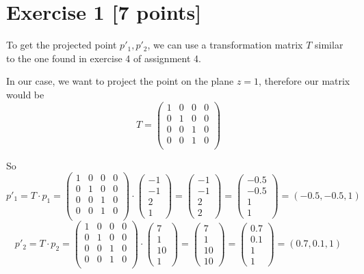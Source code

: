 \documentclass[a4paper, 11pt]{article}
\begin{document}
\maketitle

\section*{Exercise 1 [7 points]}

To get the projected point $p'_1, p'_2$, we can use a transformation matrix $T$
similar to the one found in exercise 4 of assignment 4.

In our case, we want to project the point on the plane $z=1$, therefore our
matrix would be
\newcommand{\T}{\begin{pmatrix}
		1 & 0 & 0 & 0 \\
		0 & 1 & 0 & 0 \\
		0 & 0 & 1 & 0 \\
		0 & 0 & 1 & 0 \\
	\end{pmatrix}}
$$ T = \T $$

So
$$ p'_1 = T \cdot p_1 = \T \cdot \begin{pmatrix} -1\\-1\\2\\1 \end{pmatrix} =
	\begin{pmatrix}  -1\\-1\\2\\2 \end{pmatrix}  = \begin{pmatrix} -0.5 \\-0.5\\1\\1
	\end{pmatrix}  = (-0.5, -0.5, 1)$$
$$ p'_2 = T \cdot p_2 = \T \cdot \begin{pmatrix} 7\\1\\10\\1 \end{pmatrix} =
	\begin{pmatrix}   7\\1\\10\\10  \end{pmatrix}  = \begin{pmatrix} 0.7 \\0.1\\1\\1
	\end{pmatrix}  = (0.7, 0.1, 1)$$
\end{document}
